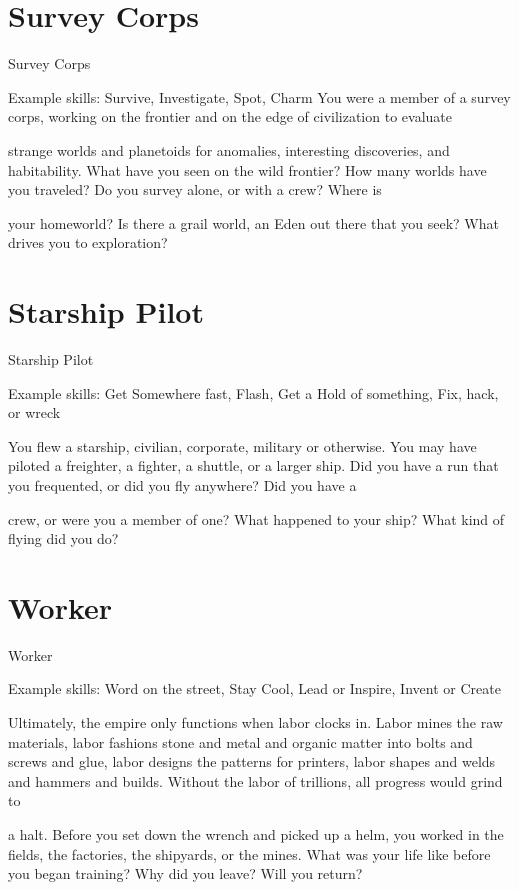 \section{Survey Corps}
                                                 Survey Corps

Example skills: Survive, Investigate, Spot, Charm
You were a member of a survey corps, working on the frontier and on the edge of civilization to evaluate

strange worlds and planetoids for anomalies, interesting discoveries, and habitability. What have you seen
on the wild frontier? How many worlds have you traveled? Do you survey alone, or with a crew? Where is

your homeworld? Is there a grail world, an Eden out there that you seek? What drives you to exploration?
\section{Starship Pilot}
                                                 Starship Pilot

Example skills: Get Somewhere fast, Flash, Get a Hold of something, Fix, hack, or wreck

You flew a starship, civilian, corporate, military or otherwise. You may have piloted a freighter, a fighter, a
shuttle, or a larger ship. Did you have a run that you frequented, or did you fly anywhere? Did you have a

crew, or were you a member of one? What happened to your ship? What kind of flying did you do?
\section{Worker}
                                                      Worker

Example skills: Word on the street, Stay Cool, Lead or Inspire, Invent or Create

Ultimately, the empire only functions when labor clocks in. Labor mines the raw materials, labor fashions
stone and metal and organic matter into bolts and screws and glue, labor designs the patterns for printers,
labor shapes and welds and hammers and builds. Without the labor of trillions, all progress would grind to

a halt. Before you set down the wrench and picked up a helm, you worked in the fields, the factories, the
shipyards, or the mines. What was your life like before you began training? Why did you leave? Will you
return?



